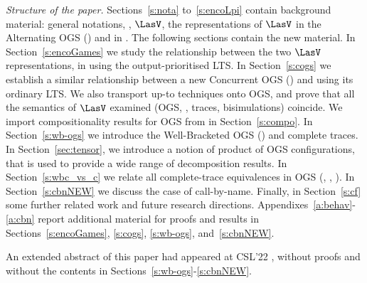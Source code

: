 \emph{Structure of the paper.} 
Sections~\ref{s:nota} to~\ref{s:encoLpi} contain background material:
general  notations,
 \piI, $\LasV$,
the representations of $\LasV$  in the   Alternating OGS (\AOGS)
and  in \piI.
The following sections contain the new material.
In Section~\ref{s:encoGames} 
we study  the relationship  between the two $\LasV$ representations, 
 in   \piI using the output-prioritised LTS. 
In  Section~\ref{s:cogs}
we establish a similar relationship between 
 a  new  Concurrent OGS (\COGS) and  \piI using its ordinary LTS. We also transport 
up-to techniques onto OGS, and prove that all the semantics of $\LasV$ examined 
(OGS, \piI, traces, bisimulations)
 coincide. 
We import compositionality results for OGS from \piI in Section~\ref{s:compo}.
In Section~\ref{s:wb-ogs} we introduce the Well-Bracketed OGS (\WBOGS) and complete
traces. 
In Section~\ref{sec:tensor},
we introduce a notion of product of OGS configurations, that is used to
provide a wide range of decomposition results.
In  Section~\ref{s:wbc_vs_c} 
we relate all complete-trace equivalences in OGS (\AOGS, \COGS, \WBOGS). 
In Section~\ref{s:cbnNEW} we discuss the case of call-by-name.
Finally, in Section~\ref{s:cf} some further related work and future research directions. 
Appendixes~\ref{a:behav}-\ref{a:cbn} report additional  material for proofs and results in
Sections~\ref{s:encoGames}, \ref{s:cogs}, \ref{s:wb-ogs}, and~\ref{s:cbnNEW}. 

An extended abstract of this paper had appeared at CSL'22
\cite{JaberS22}, without proofs and without the contents in
Sections~\ref{s:wb-ogs}-\ref{s:cbnNEW}. 




